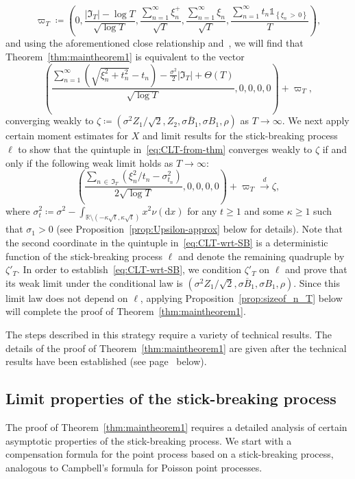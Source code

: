 \documentclass[AHL,Unicode,longabstracts,published]{cedram}
\newcommand\R{\mathbb{R}}
\newcommand\1{\mathds{1}}
\newcommand\D{\mathrm{d}}
\newcommand\GI{\mathfrak{I}}
\newcommand\cid{\xrightarrow{d}}
\newcommand\ov[1]{\overline{#1}}
\begin{document}
\[
\varpi_T\coloneqq
\left(0,\frac{|\GI_T|-\log T}{\sqrt{\log T}},\frac{\sum\limits_{n=1}^\infty\xi_n^+}{\sqrt{T}},
\frac{\sum\limits_{n=1}^\infty\xi_n}{\sqrt{T}},
\frac{\sum\limits_{n=1}^\infty t_n\1_{\left\{\xi_n\,>\,0\right\}}}{T}\right),
\]
and using the aforementioned close relationship and~\cite[Theorem~11]{CM_Fluctuation_Levy}, we will find that Theorem~\ref{thm:maintheorem1} is equivalent to the vector
\begin{equation}\label{eq:CLT-from-thm}
\left(
\frac{\sum\limits_{n=1}^\infty\left(\sqrt{\xi_n^2+t_n^2}-t_n\right) -\frac{\sigma^2}{2}|\GI_T| +\Theta(T)}{\sqrt{\log T}},0,0,0,0
\right)+\varpi_T,
\end{equation}
converging weakly to $\zeta\coloneqq(\sigma^2 Z_1/\sqrt{2}, Z_2, \sigma\ov B_1, \sigma B_1, \rho)$ as $T\to\infty$. We next apply certain moment estimates for $X$ and limit results for the stick-breaking process~$\ell$ to show that the quintuple in~\eqref{eq:CLT-from-thm} converges weakly to $\zeta$ if and only if the following weak limit holds as $T\to\infty$:
\begin{equation}\label{eq:CLT-wrt-SB}
\left(
\frac{\sum\limits_{n\,\in\,\GI_T}\left(\xi_n^2/t_n-\sigma_{t_n}^2\right)} {2\sqrt{\log T}}, 0,0,0,0
\right)+\varpi_T\cid \zeta,
\end{equation}
where $\sigma_t^2\coloneqq\sigma^2 -\int_{\R\setminus(-\kappa\sqrt{t},\kappa\sqrt{t})} x^2\nu(\D x)$ for any $t\ge 1$ and some $\kappa\ge 1$ such that $\sigma_1>0$ (see Proposition~\ref{prop:Upsilon-approx} below for details). Note that the second coordinate in the quintuple in~\eqref{eq:CLT-wrt-SB} is a deterministic function of the stick-breaking process $\ell$ and denote the remaining quadruple by $\zeta'_T$. In order to establish~\eqref{eq:CLT-wrt-SB}, we condition $\zeta'_T$ on $\ell$ and prove that its weak limit under the conditional law is $(\sigma^2Z_1/\sqrt{2}, \sigma\ov B_1, \sigma B_1,\rho)$. Since this limit law does not depend on $\ell$, applying Proposition~\ref{prop:sizeof_n_T} below will complete the proof of Theorem~\ref{thm:maintheorem1}.

The steps described in this strategy require a variety of technical results. The details of the proof of Theorem~\ref{thm:maintheorem1} are given after the technical results have been established (see page~\pageref{proof:maintheorem1} below).

\subsection{Limit properties of the stick-breaking process}\label{subsec:SB}
The proof of Theorem~\ref{thm:maintheorem1} requires a detailed analysis of certain asymptotic properties of the stick-breaking process. We start with a compensation formula for the point process based on a stick-breaking process, analogous to Campbell's formula for Poisson point processes.
\end{document}
